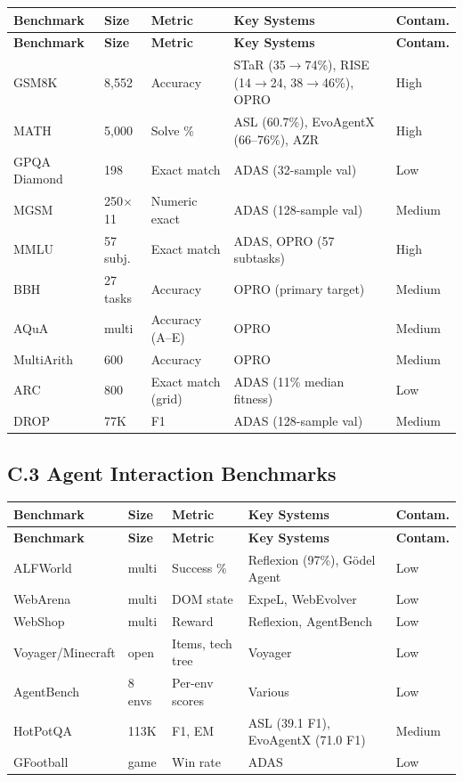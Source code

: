 \begin{longtable}{p{22mm}p{8mm}p{18mm}p{28mm}p{14mm}}
\toprule
\textbf{Benchmark} & \textbf{Size} & \textbf{Metric} & \textbf{Key Systems} & \textbf{Contam.} \\
\midrule
\endfirsthead
\toprule
\textbf{Benchmark} & \textbf{Size} & \textbf{Metric} & \textbf{Key Systems} & \textbf{Contam.} \\
\midrule
\endhead

GSM8K & 8,552 & Accuracy & STaR (35$\to$74\%), RISE (14$\to$24, 38$\to$46\%), OPRO & High \\
MATH & 5,000 & Solve \% & ASL (60.7\%), EvoAgentX (66--76\%), AZR & High \\
GPQA Diamond & 198 & Exact match & ADAS (32-sample val) & Low \\
MGSM & 250$\times$11 & Numeric exact & ADAS (128-sample val) & Medium \\
MMLU & 57 subj. & Exact match & ADAS, OPRO (57 subtasks) & High \\
BBH & 27 tasks & Accuracy & OPRO (primary target) & Medium \\
AQuA & multi & Accuracy (A--E) & OPRO & Medium \\
MultiArith & 600 & Accuracy & OPRO & Medium \\
ARC & 800 & Exact match (grid) & ADAS (11\% median fitness) & Low \\
DROP & 77K & F1 & ADAS (128-sample val) & Medium \\
\bottomrule
\end{longtable}

\subsection*{C.3 Agent Interaction Benchmarks}

\begin{longtable}{p{22mm}p{8mm}p{18mm}p{28mm}p{14mm}}
\toprule
\textbf{Benchmark} & \textbf{Size} & \textbf{Metric} & \textbf{Key Systems} & \textbf{Contam.} \\
\midrule
\endfirsthead
\toprule
\textbf{Benchmark} & \textbf{Size} & \textbf{Metric} & \textbf{Key Systems} & \textbf{Contam.} \\
\midrule
\endhead

ALFWorld & multi & Success \% & Reflexion (97\%), G\"{o}del Agent & Low \\
WebArena & multi & DOM state & ExpeL, WebEvolver & Low \\
WebShop & multi & Reward & Reflexion, AgentBench & Low \\
Voyager/Minecraft & open & Items, tech tree & Voyager & Low \\
AgentBench & 8 envs & Per-env scores & Various & Low \\
HotPotQA & 113K & F1, EM & ASL (39.1 F1), EvoAgentX (71.0 F1) & Medium \\
GFootball & game & Win rate & ADAS & Low \\
\bottomrule
\end{longtable}

